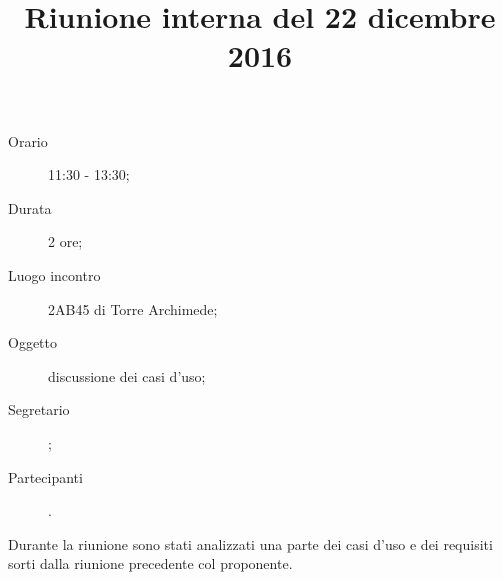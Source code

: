 


\author{\PB}
\supervisor{\MM}
\title{Riunione interna del 22 dicembre 2016}



\maketitle

\begin{description}
	\item[Orario] 11:30 - 13:30;
	\item[Durata] 2 ore;
	\item[Luogo incontro] 2AB45 di Torre Archimede;
	\item[Oggetto] discussione dei casi d'uso;
	\item[Segretario] \PB; 
	\item[Partecipanti] \ALL.
\end{description}

Durante la riunione sono stati analizzati una parte dei casi d'uso e dei requisiti sorti dalla riunione precedente col proponente.


